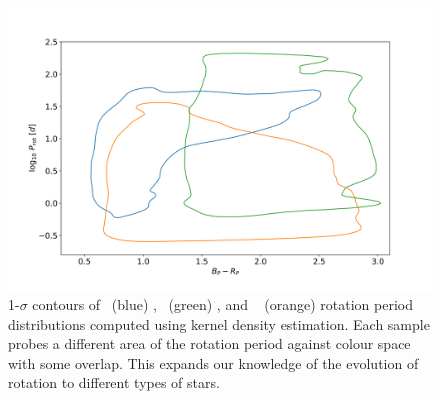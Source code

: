 \begin{figure}[h]
    \includegraphics[width=\textwidth]{Figures/intro_figures/rot_comp.png}
    \caption[1-$\sigma$ contours of \kepler\ (blue), \ZTF{}(green), and \GDRT\ (orange) rotation period distributions kernel density estimates.]{1-$\sigma$ contours of \kepler\ (blue) \citep{mcquillan_rotation_2014}, \ZTF \ (green) \citep{lu_bridging_2022}, and \GDRT\ \citep{distefano_gaia_2022} (orange) rotation period distributions computed using kernel density estimation. Each sample probes a different area of the rotation period against colour space with some overlap. This expands our knowledge of the evolution of rotation to different types of stars. }
    \label{fig:rot_comp}
\end{figure}

